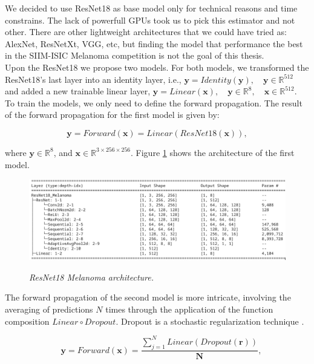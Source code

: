 We decided to use ResNet18 as base model only for technical reasons and time
constrains. The lack of powerfull GPUs took us to pick this estimator and not
other. There are other lightweight architectures that we could have tried as:
AlexNet, ResNetXt, VGG, etc, but finding the model that performance the best in
the SIIM-ISIC Melanoma competition is not the goal of this thesis. \\

Upon the ResNet18 we propose two models. For both models, we transformed the
ResNet18's last layer into an identity layer, i.e., \(\mathbf{y} =
Identity(\mathbf{y}), \quad \mathbf{y} \in \mathbb{R}^{512}\) and added a new
trainable linear layer, \(\mathbf{y} = Linear(\mathbf{x}), \quad \mathbf{y} \in
\mathbb{R}^8, \quad \mathbf{x} \in \mathbb{R}^{512}\). \\

To train the models, we only need to define the forward propagation. The result
of the forward propagation for the first model is given by:

\[ \mathbf{y} = Forward(\mathbf{x}) = Linear(ResNet18(\mathbf{x})), \]

where \( \mathbf{y} \in \mathbb{R}^8 \), and \( \mathbf{x}  \in
\mathbb{R}^{3 \times 256 \times 256} \). Figure \ref{fig:resnet-18-melanoma-arch} shows
the architecture of the first model.

\begin{figure}[H]
  \centering
  \includegraphics[width=\textwidth]{imatges/methodological_contribution/ResNet18_Melanoma.png}
  \caption[ResNet18\_Melanoma architecture]{\textit{ResNet18 Melanoma architecture.}}
  {\label{fig:resnet-18-melanoma-arch}}
\end{figure}

The forward propagation of the second model is more intricate, involving the
averaging of predictions \(N\) times through the application of the function
composition \(Linear \circ Dropout\). Dropout is a stochastic regularization
technique \cite{DropoutPaper}.

\[ \quad \mathbf{y} = Forward(\mathbf{x}) = \frac{\sum_{j=1}^{N} Linear(Dropout(\mathbf{r}))}{\mathbf{N}}, \]

